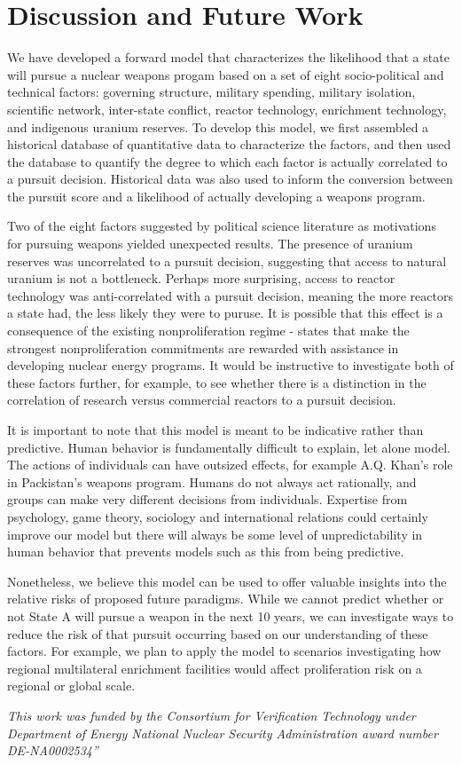 \section{Discussion and Future Work}
\label{s_dis}

We have developed a forward model that characterizes the likelihood that a state will pursue a nuclear weapons progam based on a set of eight socio-political and technical factors: governing structure, military spending, military isolation, scientific network, inter-state conflict, reactor technology, enrichment technology, and indigenous uranium reserves. To develop this model, we first assembled a historical database of quantitative data to characterize the factors, and then used the database to quantify the degree to which each factor is actually correlated to a pursuit decision. Historical data was also used to inform the conversion between the pursuit score and a likelihood of actually developing a weapons program. 

Two of the eight factors suggested by political science literature as motivations for pursuing weapons yielded unexpected results. The presence of uranium reserves was uncorrelated to a pursuit decision, suggesting that access to natural uranium is not a bottleneck.  Perhaps more surprising, access to reactor technology was anti-correlated with a pursuit decision, meaning the more reactors a state had, the less likely they were to puruse. It is possible that this effect is a consequence of the existing nonproliferation regime - states that make the strongest nonproliferation commitments are rewarded with assistance in developing nuclear energy programs.  It would be instructive to investigate both of these factors further, for example, to see whether there is a distinction in the correlation of research versus commercial reactors to a pursuit decision.

It is important to note that this model is meant to be indicative rather than predictive. Human behavior is fundamentally difficult to explain, let alone model.  The actions of individuals can have outsized effects, for example A.Q. Khan's role in Packistan's weapons program.  Humans do not always act rationally, and groups can make very different decisions from individuals.  Expertise from psychology, game theory, sociology and international relations could certainly improve our model but there will always be some level of unpredictability in human behavior that prevents models such as this from being predictive.

Nonetheless, we believe this model can be used to offer valuable insights into the relative risks of proposed future paradigms. While we cannot predict whether or not State A will pursue a weapon in the next 10 years, we can investigate ways to reduce the risk of that pursuit occurring based on our understanding of these factors. For example, we plan to apply the model to scenarios investigating how regional multilateral enrichment facilities would affect proliferation risk on a regional or global scale.  


\textit{This work was funded by the Consortium for Verification Technology under Department of Energy National Nuclear Security Administration award number DE-NA0002534”}

